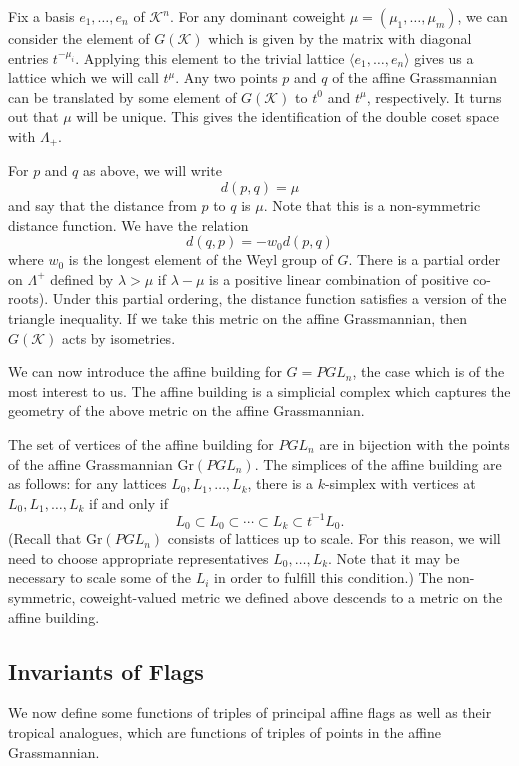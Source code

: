 \documentclass[ALCO,ThmDefs,Unicode,epreuves]{cedram}
\newcommand{\cK}{\mathcal{K}}
\newcommand{\Gr}{\mathrm{Gr}}
\begin{document}
Fix a basis $e_1, \dots, e_n$ of $\cK^n$. For any dominant coweight $\mu=(\mu_1, \dots, \mu_m)$, we can consider the element of $G(\cK)$ which is given by the matrix with diagonal entries $t^{-\mu_i}$. Applying this element to the trivial lattice $\langle e_1, \dots, e_n\rangle $ gives us a lattice which we will call $t^\mu$. Any two points $p$ and $q$ of the affine Grassmannian can be translated by some element of $G(\cK)$ to $t^0$ and $t^\mu$, respectively. It turns out that $\mu$ will be unique. This gives the identification of the double coset space with $\Lambda_+$.

For $p$ and $q$ as above, we will write 
\[
d(p,q) = \mu
\]
and say that the distance from $p$ to $q$ is $\mu$. Note that this is a non-symmetric distance function. We have the relation 
\[
d(q,p)=-w_0 d(p,q)
\]
 where $w_0$ is the longest element of the Weyl group of $G$. There is a partial order on $\Lambda^+$ defined by $\lambda > \mu$ if $\lambda - \mu$ is a positive linear combination of positive co-roots). Under this partial ordering, the distance function satisfies a version of the triangle inequality. If we take this metric on the affine Grassmannian, then $G(\cK)$ acts by isometries.

We can now introduce the affine building for $G=PGL_n$, the case which is of the most interest to us. The affine building is a simplicial complex which captures the geometry of the above metric on the affine Grassmannian.

The set of vertices of the affine building for $PGL_n$ are in bijection with the points of the affine Grassmannian $\Gr(PGL_n)$. The simplices of the affine building are as follows: for any lattices $L_0, L_1, \dots, L_k$, there is a $k$-simplex with vertices at $L_0, L_1, \dots, L_k$ if and only if 
\[
L_0 \subset L_0 \subset \cdots \subset L_k \subset t^{-1}L_0.
\]
(Recall that $\Gr(PGL_n)$ consists of lattices up to scale. For this reason, we will need to choose appropriate representatives $L_0, \dots, L_k$. Note that it may be necessary to scale some of the $L_i$ in order to fulfill this condition.) The non-symmetric, coweight-valued metric we defined above descends to a metric on the affine building.

\subsection{Invariants of Flags}

We now define some functions of triples of principal affine flags as well as their tropical analogues, which are functions of triples of points in the affine Grassmannian.
\end{document}
